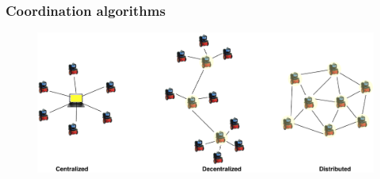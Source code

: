 \begin{frame}
	\frametitle{Coordination algorithms}
		\begin{figure}
			\includegraphics[width=1\textwidth]{figures/robots}
			\label{fig:cent}
		\end{figure}
	
\end{frame}


